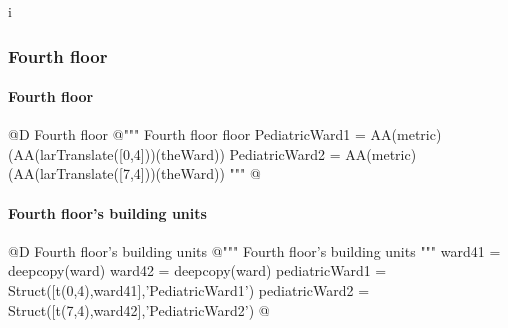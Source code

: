 i\documentclass[11pt,oneside]{article}    %
\begin{document}
\subsubsection{Fourth floor}
\paragraph{Fourth floor}
@D Fourth floor
@{""" Fourth floor floor 
PediatricWard1 = AA(metric)(AA(larTranslate([0,4]))(theWard))
PediatricWard2 = AA(metric)(AA(larTranslate([7,4]))(theWard)) """
@}

\paragraph{Fourth floor's building units}
@D Fourth floor's building units 
@{""" Fourth floor's building units """
ward41 = deepcopy(ward)
ward42 = deepcopy(ward)
pediatricWard1 = Struct([t(0,4),ward41],'PediatricWard1')
pediatricWard2 = Struct([t(7,4),ward42],'PediatricWard2')
@}
\end{document}
